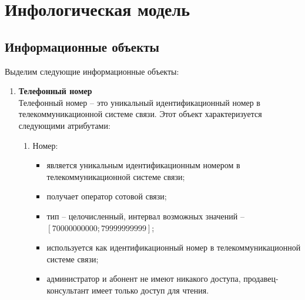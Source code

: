 \section{Инфологическая модель}\label{sec:infological-model}

\subsection{Информационные объекты}\label{subsec:information-objects}

Выделим следующие информационные объекты:
\begin{enumerate}
    \item \textbf{Телефонный номер} \\
    Телефонный номер -- это уникальный идентификационный номер в телекоммуникационной системе связи. Этот объект характеризуется следующими атрибутами:
    \begin{enumerate}
        \item Номер:
        \begin{itemize}
            \item является уникальным идентификационным номером в телекоммуникационной системе связи;
            \item получает оператор сотовой связи;
            \item тип -- целочисленный, интервал возможных значений -- $[70000000000; 79999999999]$;
            \item используется как идентификационный номер в телекоммуникационной системе связи;
            \item администратор и абонент не имеют никакого доступа, продавец-консультант имеет только доступ для чтения.
        \end{itemize}


\end{enumerate}
\end{enumerate}
